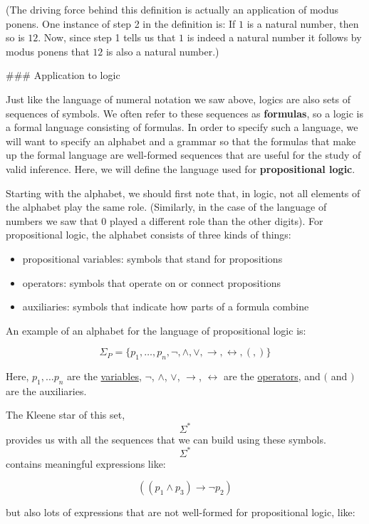 \documentclass[11pt]{article}
\begin{document}
(The driving force behind this definition is actually an application of modus ponens. One instance of step 2 in the definition is: If \(1\) is a natural number, then so is \(12\). Now, since step 1 tells us that \(1\) is indeed a natural number it follows by modus ponens that \(12\) is also a natural number.) 

\#\#\# Application to logic

Just like the language of numeral notation we saw above, logics are also sets of sequences of symbols. We often refer to these sequences as \textbf{\textbf{formulas}}, so a logic is a formal language consisting of formulas. In order to specify such a language, we will want to specify an alphabet and a grammar so that the formulas that make up the formal language are well-formed sequences that are useful for the study of valid inference. Here, we will define the language used for \textbf{\textbf{propositional logic}}. 

Starting with the alphabet, we should first note that, in logic, not all elements of the alphabet play the same role. (Similarly, in the case of the language of numbers we saw that 0 played a different role than the other digits). For propositional logic, the alphabet consists of three kinds of things: 

\begin{itemize}
\item propositional variables: symbols that stand for propositions
\item operators: symbols that operate on or connect propositions
\item auxiliaries: symbols that indicate how parts of a formula combine
\end{itemize}

An example of an alphabet for the language of propositional logic is:


$$\Sigma_P = \{p_1,\ldots,p_n,\neg,\land,\lor,\rightarrow,\leftrightarrow,(,)\}$$

Here, \(p_1,\ldots p_n\) are the \uline{variables}, \(\neg\), \(\land\), \(\lor\), \(\rightarrow\), \(\leftrightarrow\) are the \uline{operators}, and \((\) and \()\) are the auxiliaries.

The Kleene star of this set, $$\Sigma^*$$ provides us with all the sequences that we can build using these symbols. $$\Sigma^*$$ contains meaningful expressions like:

$$((p_1\land p_3)\rightarrow \neg p_2)$$

but also lots of expressions that are not well-formed for propositional logic, like:
\end{document}
